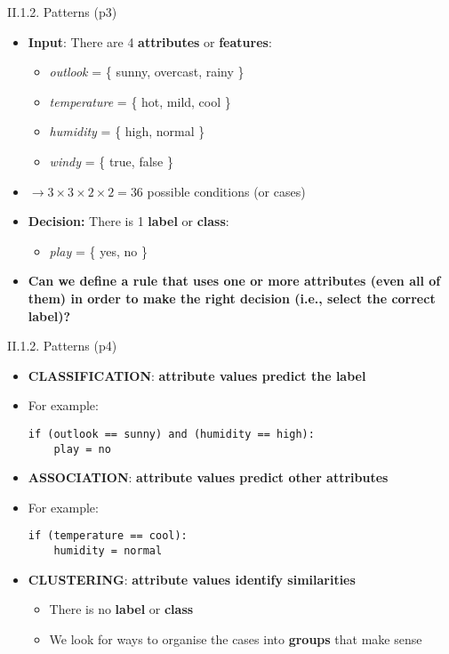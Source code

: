 \documentclass[handout]{beamer}
\newcommand{\strong}[1]{\textbf{\color{teal} #1}}
\newcommand{\stronger}[1]{\textbf{\color{purple} #1}}
\begin{document}
\begin{frame}{II.1.2. Patterns (p3)}
\begin{itemize}
\item \stronger{Input}: There are 4 \textbf{attributes} or \textbf{features}:
	\begin{itemize}
	\item \emph{outlook} = \{ sunny, overcast, rainy \}
	\item \emph{temperature} = \{ hot, mild, cool \}
	\item \emph{humidity} = \{ high, normal \}
	\item \emph{windy} = \{ true, false \}
	\end{itemize}
\item[] $\rightarrow 3 \times 3 \times 2 \times 2 = 36$ possible conditions (or cases)
\item \stronger{Decision:} There is 1 \textbf{label} or \textbf{class}:
	\begin{itemize}
	\item \emph{play} = \{ yes, no \}
	\end{itemize}
\item \strong{Can we define a \stronger{rule} that uses one or more attributes (even all of them) in order to make the right decision (i.e., select the correct label)?}
\end{itemize}
\end{frame}
\begin{frame}[fragile]{II.1.2. Patterns (p4)}
\begin{itemize}
\item \stronger{CLASSIFICATION}: \strong{attribute values predict the label}
\item[] For example:\\
\begin{lstlisting}[numbers=none]
if (outlook == sunny) and (humidity == high):
	play = no
\end{lstlisting}
%
\item \stronger{ASSOCIATION}: \strong{attribute values predict other attributes}
\item[] For example:\\
\begin{lstlisting}[numbers=none]
if (temperature == cool):
	humidity = normal
\end{lstlisting}
%
\item \stronger{CLUSTERING}: \strong{attribute values identify similarities}
	\begin{itemize}
	\item There is no \textbf{label} or \textbf{class}
	\item We look for ways to organise the cases into \textbf{groups} that make sense\\
	\end{itemize}
%
\end{itemize}
\end{frame}
\end{document}
